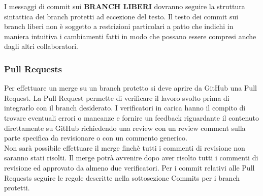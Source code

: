 I messaggi di commit sui \textbf{\uppercase{branch liberi}} dovranno seguire la struttura sintattica dei branch protetti ad eccezione del testo.
Il testo dei commit sui branch liberi non è soggetto a restrizioni particolari a patto che indichi in maniera intuitiva i cambiamenti fatti
in modo che possano essere compresi anche dagli altri collaboratori.



\subsubsection{Pull Requests}
Per effettuare un merge su un branch protetto si deve aprire da GitHub una Pull Request.
La Pull Request permette di verificare il lavoro svolto prima di integrarlo con il branch desiderato.
I verificatori in carica hanno il compito di trovare eventuali errori o mancanze e fornire un feedback riguardante il contenuto direttamente su GitHub richiedendo
una review con un review comment sulla parte specifica da revisionare o con un commento generico.\\
Non sarà possibile effettuare il merge finchè tutti i commenti di revisione non saranno stati risolti.
Il merge potrà avvenire dopo aver risolto tutti i commenti di revisione ed approvato da almeno due verificatori.
Per i commit relativi alle Pull Requests seguire le regole descritte nella sottosezione Commits per i branch protetti.



